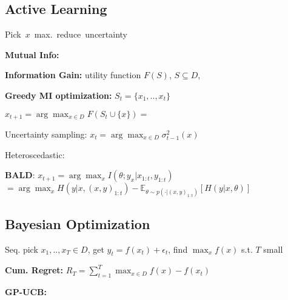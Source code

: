 \subsection*{Active Learning}

\mbox{Pick $x$ max. reduce uncertainty}

\textbf{Mutual Info:} \; 


\textbf{Information Gain:} utility function $F(S)$, $S \subseteq D$, 

\textbf{Greedy MI optimization:} \; $S_t = \{x_1,.., x_t\}$

$x_{t+1} = \arg\max_{x \in D} F(S_t \cup \{x\}) = $ 

\iffalse
\vspace*{-1mm}
$\rightarrow$ constant-factor near optimal.
\vspace*{-1mm}
\fi

Uncertainty sampling: \; $x_t = \arg\max_{x \in D} \sigma_{t-1}^2(x)$

Heteroscedastic: \; 

\vspace*{-0.5mm}
\textbf{BALD}: \; $x_{t+1} = \arg\max_x I(\theta; y_x | x_{1:t}, y_{1:t}) $\\
$= \arg\max_x H(y | x, (x,y)_{1:t}) - \mathbb{E}_{\theta \sim p(\cdot | (x,y)_{1:t})}[H(y | x, \theta)]$

\vspace*{-0.5mm}
\subsection*{Bayesian Optimization} Seq. pick $x_1,..,x_T \in D$, get $y_t = f(x_t) + \epsilon_t$, find $\max_x f(x)$ s.t. $T$ small

\vspace*{-0.5mm}
\textbf{Cum. Regret:} \; $R_T = \sum_{t=1}^{T} \max_{x \in D} f(x) - f(x_t)$

\textbf{GP-UCB:} \; 

